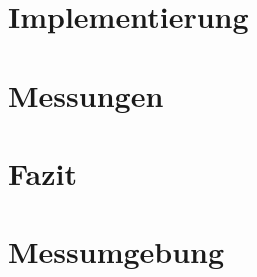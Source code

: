 \documentclass[a4paper, 11pt, toc=bibliography, toc=listof]{scrbook}
\begin{document}

  \chapter{Implementierung} %
  \label{cha:Implementierung}


  \chapter{Messungen} %
  \label{cha:Messungen}


  \chapter{Fazit} %
  \label{cha:Fazit}



  \appendix

  \chapter{Messumgebung} %
  \label{cha:Messumgebung}



  \backmatter

  \listoffigures{}
  \listoftables{}

  \nocite{*}
  
  

\end{document}
